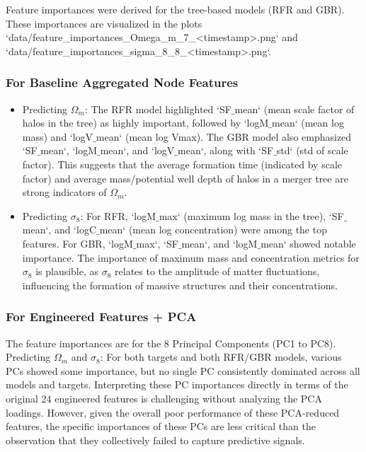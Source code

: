 \documentclass[twocolumn]{aastex631}
\begin{document}
Feature importances were derived for the tree-based models (RFR and GBR). These importances are visualized in the plots `data/feature_importances_Omega_m_7_<timestamp>.png` and `data/feature_importances_sigma_8_8_<timestamp>.png`.

\subsubsection{For Baseline Aggregated Node Features}
\begin{itemize}
    \item Predicting $\Omega_m$:
    The RFR model highlighted `SF\ensuremath{\_}mean` (mean scale factor of halos in the tree) as highly important, followed by `logM\ensuremath{\_}mean` (mean log mass) and `logV\ensuremath{\_}mean` (mean log Vmax). The GBR model also emphasized `SF\ensuremath{\_}mean`, `logM\ensuremath{\_}mean`, and `logV\ensuremath{\_}mean`, along with `SF\ensuremath{\_}std` (std of scale factor). This suggests that the average formation time (indicated by scale factor) and average mass/potential well depth of halos in a merger tree are strong indicators of $\Omega_m$.
    \item Predicting $\sigma_8$:
    For RFR, `logM\ensuremath{\_}max` (maximum log mass in the tree), `SF\ensuremath{\_}mean`, and `logC\ensuremath{\_}mean` (mean log concentration) were among the top features. For GBR, `logM\ensuremath{\_}max`, `SF\ensuremath{\_}mean`, and `logM\ensuremath{\_}mean` showed notable importance. The importance of maximum mass and concentration metrics for $\sigma_8$ is plausible, as $\sigma_8$ relates to the amplitude of matter fluctuations, influencing the formation of massive structures and their concentrations.
\end{itemize}

\subsubsection{For Engineered Features + PCA}
The feature importances are for the 8 Principal Components (PC1 to PC8). Predicting $\Omega_m$ and $\sigma_8$: For both targets and both RFR/GBR models, various PCs showed some importance, but no single PC consistently dominated across all models and targets. Interpreting these PC importances directly in terms of the original 24 engineered features is challenging without analyzing the PCA loadings. However, given the overall poor performance of these PCA-reduced features, the specific importances of these PCs are less critical than the observation that they collectively failed to capture predictive signals.
\end{document}
